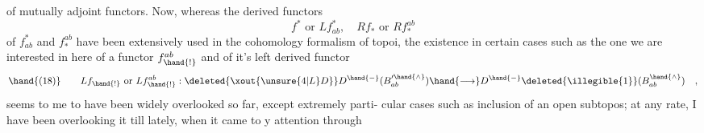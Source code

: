 of mutually adjoint functors. Now, whereas the derived functors
\[ f^{*} \text{ or } Lf^{*}_{ab} , \quad Rf_{*} \text{ or } Rf^{ab}_{*} \]
of $f^{*}_{ab}$ and $f^{ab}_{*}$ have been extensively used in the  cohomology formalism
of topoi, the  existence in certain cases\hand{,} \hand{(}such as the one we are
interested in here\hand{)} of a functor $f^{ab}_{\hand{!}}$ and of it's left derived functor
\[ \hand{(18)} \qquad Lf_{\hand{!}} \text{ or } Lf^{ab}_{\hand{!}} : \deleted{\xout{\unsure{4|L}D}} D^{\hand{-}}(B'^{\hand{\wedge}}_{ab}) \hand{\longrightarrow} D^{\hand{-}}\deleted{\illegible{1}}(B^{\hand{\wedge}}_{ab}) \quad , \]
seems to me to have been widely overlooked so far, except  extremely parti-%
cular cases such as inclusion of an open subtopos; at any rate, I have
been overlooking it till lately, when it came to y attention through


